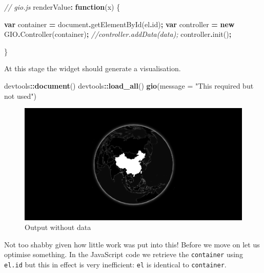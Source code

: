 \documentclass[
]{krantz}
\makeatletter
\newenvironment{Shaded}{\begin{snugshade}}{\end{snugshade}}
\newcommand{\AttributeTok}[1]{\textcolor[rgb]{0.61,0.61,0.61}{#1}}
\newcommand{\BuiltInTok}[1]{#1}
\newcommand{\CommentTok}[1]{\textcolor[rgb]{0.37,0.37,0.37}{\textit{#1}}}
\newcommand{\DataTypeTok}[1]{\textcolor[rgb]{0.27,0.27,0.27}{#1}}
\newcommand{\FunctionTok}[1]{\textcolor[rgb]{0,0,0}{#1}}
\newcommand{\KeywordTok}[1]{\textcolor[rgb]{0.27,0.27,0.27}{\textbf{#1}}}
\newcommand{\NormalTok}[1]{#1}
\newcommand{\OperatorTok}[1]{\textcolor[rgb]{0.43,0.43,0.43}{\textbf{#1}}}
\newcommand{\StringTok}[1]{\textcolor[rgb]{0.5,0.5,0.5}{#1}}
\newenvironment{kframe}{%
\medskip{}
\setlength{\fboxsep}{.8em}
 \def\at@end@of@kframe{}%
 \ifinner\ifhmode%
  \def\at@end@of@kframe{\end{minipage}}%
  \begin{minipage}{\columnwidth}%
 \fi\fi%
 \def\FrameCommand##1{\hskip\@totalleftmargin \hskip-\fboxsep
 \colorbox{shadecolor}{##1}\hskip-\fboxsep
     \hskip-\linewidth \hskip-\@totalleftmargin \hskip\columnwidth}%
 \MakeFramed {\advance\hsize-\width
   \@totalleftmargin\z@ \linewidth\hsize
   \@setminipage}}%
 {\par\unskip\endMakeFramed%
 \at@end@of@kframe}
\renewenvironment{Shaded}{\begin{kframe}}{\end{kframe}}
\makeatother
\begin{document}
\begin{Shaded}
\begin{Highlighting}[]
\CommentTok{// gio.js}
\NormalTok{renderValue}\OperatorTok{:} \KeywordTok{function}\NormalTok{(x) \{}

  \KeywordTok{var}\NormalTok{ container }\OperatorTok{=} \BuiltInTok{document}\OperatorTok{.}\FunctionTok{getElementById}\NormalTok{(el}\OperatorTok{.}\AttributeTok{id}\NormalTok{)}\OperatorTok{;}
  \KeywordTok{var}\NormalTok{ controller }\OperatorTok{=} \KeywordTok{new}\NormalTok{ GIO}\OperatorTok{.}\FunctionTok{Controller}\NormalTok{(container)}\OperatorTok{;}
  \CommentTok{//controller.addData(data);}
\NormalTok{  controller}\OperatorTok{.}\FunctionTok{init}\NormalTok{()}\OperatorTok{;}

\NormalTok{\}}
\end{Highlighting}
\end{Shaded}

At this stage the widget should generate a visualisation.

\begin{Shaded}
\begin{Highlighting}[]
\NormalTok{devtools}\OperatorTok{::}\KeywordTok{document}\NormalTok{()}
\NormalTok{devtools}\OperatorTok{::}\KeywordTok{load\_all}\NormalTok{()}
\KeywordTok{gio}\NormalTok{(}\DataTypeTok{message =} \StringTok{"This required but not used"}\NormalTok{)}
\end{Highlighting}
\end{Shaded}

\begin{figure}
\centering
\includegraphics{images/gio-init.png}
\caption{Output without data}
\end{figure}

Not too shabby given how little work was put into this! Before we move on let us optimise something. In the JavaScript code we retrieve the \texttt{container} using \texttt{el.id} but this in effect is very inefficient: \texttt{el} is identical to \texttt{container}.
\end{document}
